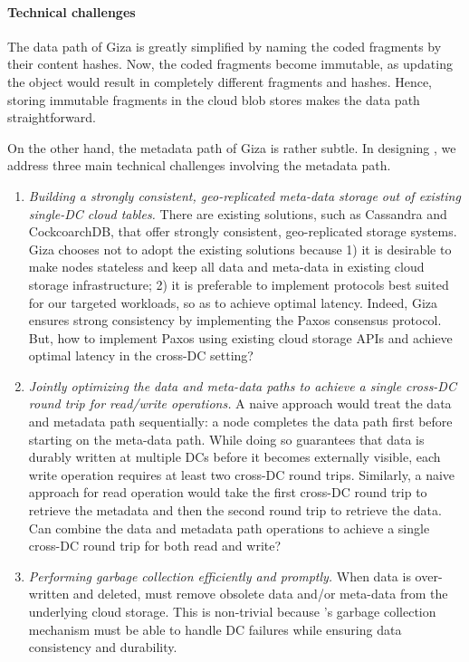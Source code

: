 \paragraph{Technical challenges}
The data path of Giza is greatly simplified by naming the coded fragments by their content hashes.
Now, the coded fragments become immutable, as updating the object would result in completely different fragments and hashes.
Hence, storing immutable fragments in the cloud blob stores makes the data path straightforward.

On the other hand, the metadata path of Giza is rather subtle.
In designing \name, we address three main technical challenges involving the metadata path.
\begin{enumerate}

\item {\it Building a strongly consistent, geo-replicated meta-data storage out of existing 
single-DC cloud tables.}
There are existing solutions, such as Cassandra and CockcoarchDB,
that offer strongly consistent, geo-replicated storage systems.
Giza chooses not to adopt the existing solutions because
1) it is desirable to make \name nodes stateless and keep all data and meta-data
in existing cloud storage infrastructure;
2) it is preferable to implement protocols best suited for our targeted workloads,
so as to achieve optimal latency.
Indeed, Giza ensures strong consistency by implementing the Paxos consensus protocol.
But, how to implement Paxos using existing cloud storage APIs and achieve 
optimal latency in the cross-DC setting?

\item {\it Jointly optimizing the data and meta-data paths to achieve a single
cross-DC round trip for read/write operations.}
A naive approach would treat the data and metadata path sequentially:
a \name node completes the data path first before starting on the meta-data path.
While doing so guarantees that data is durably written at multiple DCs
before it becomes externally visible, each write operation requires at least two cross-DC round trips.
Similarly, a naive approach for read operation would take the first cross-DC round trip to retrieve the metadata
and then the second round trip to retrieve the data.
Can \name combine the data and metadata path operations to achieve a single cross-DC round trip for both read and write?

\item {\it Performing garbage collection efficiently and promptly.} 
When data is over-written and deleted, \name must remove obsolete data and/or meta-data from
the underlying cloud storage.  This is non-trivial because \name's garbage 
collection mechanism must be able to handle DC failures while ensuring data 
consistency and durability.

\end{enumerate}

